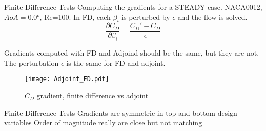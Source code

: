 \begin{frame}{Finite Difference Tests}
Computing the gradients for a STEADY case. NACA0012, $AoA=\ang{0.0}$, Re=100. 
In FD, each $\beta_i$ is perturbed by $\epsilon$ and the flow is solved. 
$$ \dfrac{\partial C_D }{\partial \beta _ i} = \dfrac{C_D'-C_D}{\epsilon}$$

Gradients computed with FD and Adjoind should be the same, but they are not. The perturbation $\epsilon$ is the same for FD and adjoint.
\begin{figure}[h]
    \centering          
        \texttt{[image: Adjoint\_FD.pdf]}
       \caption{$C_D$ gradient, finite difference vs adjoint}
    \end{figure} 
\end{frame}

\begin{frame}{Finite Difference Tests}
Gradients are symmetric in top and bottom design variables
Order of magnitude really are close but not matching 
\end{frame}